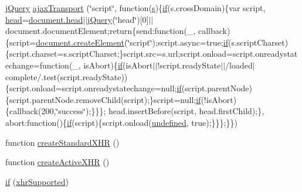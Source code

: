 \begin{DoxyCompactItemize}
\item 
\hyperlink{_scripts_2jquery-1_810_82_8js_a41c2e1bff4a6b292938143764e31d789}{j\+Query} \hyperlink{_scripts_2jquery-1_810_82_8js_ade7f5e1842214b9c2ed0c201344a110c}{ajax\+Transport} (\char`\"{}script\char`\"{}, function(\hyperlink{_scripts_2respond_8min_8js_ad9a7d92cb87932d25187fdec3ba1b621}{s})\{\hyperlink{_scripts_2respond_8min_8js_a93851d60dd037a83509a1757b9ee7b66}{if}(s.\+cross\+Domain)\{var script, \hyperlink{_scripts_2respond_8js_aeb4eed5f5e638eafa138655bd16be507}{head}=\hyperlink{_scripts_2respond_8js_aeb4eed5f5e638eafa138655bd16be507}{document.\+head}$\vert$$\vert$\hyperlink{_scripts_2jquery-1_810_82_8js_a41c2e1bff4a6b292938143764e31d789}{j\+Query}(\char`\"{}head\char`\"{})\mbox{[}0\mbox{]}$\vert$$\vert$document.\+document\+Element;return\{send\+:function(\+\_\+, callback)\{script=\hyperlink{_scripts_2dropzone_8js_a96f0c341e85b096ddfd669eee0981f51}{document.\+create\+Element}(\char`\"{}script\char`\"{});script.\+async=true;\hyperlink{_scripts_2respond_8min_8js_a93851d60dd037a83509a1757b9ee7b66}{if}(s.\+script\+Charset)\{script.\+charset=s.\+script\+Charset;\}script.\+src=s.\+url;script.\+onload=script.\+onreadystatechange=function(\+\_\+, is\+Abort)\{\hyperlink{_scripts_2respond_8min_8js_a93851d60dd037a83509a1757b9ee7b66}{if}(is\+Abort$\vert$$\vert$!script.\+ready\+State$\vert$$\vert$/loaded$\vert$complete/.test(script.\+ready\+State))\{script.\+onload=script.\+onreadystatechange=null;\hyperlink{_scripts_2respond_8min_8js_a93851d60dd037a83509a1757b9ee7b66}{if}(script.\+parent\+Node)\{script.\+parent\+Node.\+remove\+Child(script);\}script=null;\hyperlink{_scripts_2respond_8min_8js_a93851d60dd037a83509a1757b9ee7b66}{if}(!is\+Abort)\{callback(200,\char`\"{}success\char`\"{});\}\}\};   head.\+insert\+Before(script, head.\+first\+Child);\}, abort\+:function()\{\hyperlink{_scripts_2respond_8min_8js_a93851d60dd037a83509a1757b9ee7b66}{if}(script)\{script.\+onload(\hyperlink{_scripts_2jquery-1_810_82_8js_a08113a236cc18d2a9d5ce27e638012be}{undefined}, true);\}\}\};\}\})
\item 
function \hyperlink{_scripts_2jquery-1_810_82_8js_acea019a8b67e4d114deb75d1e0b3474a}{create\+Standard\+X\+H\+R} ()
\item 
function \hyperlink{_scripts_2jquery-1_810_82_8js_a54bf63f1b5f905292db45a1d6a9dc300}{create\+Active\+X\+H\+R} ()
\item 
\hyperlink{_scripts_2jquery-1_810_82_8js_ae2dd433d7bb020adf83db5351a0671e1}{if} (\hyperlink{_scripts_2jquery-1_810_82_8js_afd7e72f2f357a5a8b17e46776a6283eb}{xhr\+Supported})
\item 

\end{DoxyCompactItemize}
